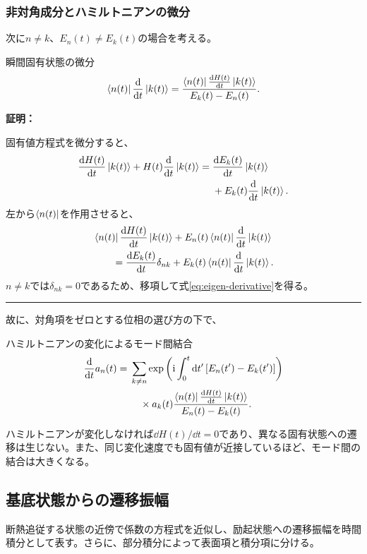 \documentclass[a4paper,10.5pt]{article}
\numberwithin{equation}{section}
\providecommand{\ii}{\mathrm{i}}
\newenvironment{proofbox}
{\begin{prooflabel}\textbf{証明：}\end{prooflabel}\vspace{0.8em}}
{\par\vspace{1em}\hrule\vspace{1em}}
\begin{document}
\subsubsection{非対角成分とハミルトニアンの微分}
次に$n\neq k$、$E_n(t)\neq E_k(t)$の場合を考える。
\begin{resultbox}{瞬間固有状態の微分}
\begin{align}
\bra{n(t)}\frac{\dd}{\dd t}\ket{k(t)}
=\frac{\bra{n(t)}\frac{\dd H(t)}{\dd t}\ket{k(t)}}
{E_k(t)-E_n(t)}.
\label{eq:eigen-derivative}
\end{align}
\end{resultbox}
\begin{proofbox}
固有値方程式を微分すると、
\begin{align}
\frac{\dd H(t)}{\dd t}\ket{k(t)}
+H(t)\frac{\dd}{\dd t}\ket{k(t)}
={}&\frac{\dd E_k(t)}{\dd t}\ket{k(t)}
\notag\\
&+E_k(t)\frac{\dd}{\dd t}\ket{k(t)}.
\end{align}
左から$\bra{n(t)}$を作用させると、
\begin{align}
&\bra{n(t)}\frac{\dd H(t)}{\dd t}\ket{k(t)}
+E_n(t)\bra{n(t)}\frac{\dd}{\dd t}\ket{k(t)}
\notag\\
&\qquad=
\frac{\dd E_k(t)}{\dd t}\delta_{nk}
+E_k(t)\bra{n(t)}\frac{\dd}{\dd t}\ket{k(t)}.
\end{align}
$n\neq k$では$\delta_{nk}=0$であるため、移項して式\eqref{eq:eigen-derivative}を得る。
\end{proofbox}
故に、対角項をゼロとする位相の選び方の下で、
\begin{resultbox}{ハミルトニアンの変化によるモード間結合}
\begin{align}
\frac{\dd}{\dd t}a_n(t)
={}&\sum_{k\neq n}
\exp\left(\ii\int_0^t\dd t'\,[E_n(t')-E_k(t')]\right)
\notag\\
&\quad\times a_k(t)
\frac{\bra{n(t)}\frac{\dd H(t)}{\dd t}\ket{k(t)}}
{E_n(t)-E_k(t)}.
\label{eq:coeff-h}
\end{align}
\end{resultbox}
ハミルトニアンが変化しなければ$\dd H(t)/\dd t=0$であり、異なる固有状態への遷移は生じない。また、同じ変化速度でも固有値が近接しているほど、モード間の結合は大きくなる。

\subsection{基底状態からの遷移振幅}
断熱追従する状態の近傍で係数の方程式を近似し、励起状態への遷移振幅を時間積分として表す。さらに、部分積分によって表面項と積分項に分ける。
\end{document}
